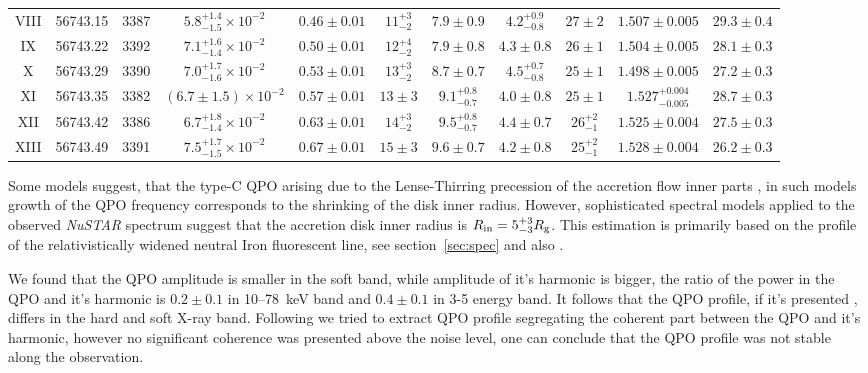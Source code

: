 \documentclass[a4paper,fleqn,usenatbib]{mnras}
\begin{document}
\begin{table}
\begin{tabular}{|c|c|c|c|c|c|c|c|c|c|c|}
VIII & 56743.15 & 3387 & $5.8_{-1.5}^{+1.4}\times10^{-2}$ & $0.46\pm0.01$ & $11_{-2}^{+3}$ & $7.9\pm0.9$ & $4.2_{-0.8}^{+0.9}$ & $27\pm2$ & $1.507\pm0.005$ & $29.3\pm0.4$ & \\
IX & 56743.22 & 3392 & $7.1_{-1.4}^{+1.6}\times10^{-2}$ & $0.50\pm0.01$ & $12_{-2}^{+4}$ & $7.9\pm0.8$ & $4.3\pm0.8$ & $26\pm1$ & $1.504\pm0.005$ & $28.1\pm0.3$ & \\
X & 56743.29 & 3390 & $7.0_{-1.6}^{+1.7}\times10^{-2}$ & $0.53\pm0.01$ & $13_{-2}^{+3}$ & $8.7\pm0.7$ & $4.5_{-0.8}^{+0.7}$ & $25\pm1$ & $1.498\pm0.005$ & $27.2\pm0.3$ & \\
XI & 56743.35 & 3382 & $(6.7\pm1.5)\times10^{-2}$ & $0.57\pm0.01$ & $13\pm3$ & $9.1_{-0.7}^{+0.8}$ & $4.0\pm0.8$ & $25\pm1$ & $1.527_{-0.005}^{+0.004}$ & $28.7\pm0.3$ & \\
XII & 56743.42 & 3386 & $6.7_{-1.4}^{+1.8}\times10^{-2}$ & $0.63\pm0.01$ & $14_{-2}^{+3}$ & $9.5_{-0.7}^{+0.8}$ & $4.4\pm0.7$ & $26_{-1}^{+2}$ & $1.525\pm0.004$ & $27.5\pm0.3$ & \\
XIII & 56743.49 & 3391 & $7.5_{-1.5}^{+1.7}\times10^{-2}$ & $0.67\pm0.01$ & $15\pm3$ & $9.6\pm0.7$ & $4.2\pm0.8$ & $25_{-1}^{+2}$ & $1.528\pm0.004$ & $26.2\pm0.3$ & \\
\hline
\end{tabular}
\end{table}

Some models suggest, that the type-C QPO arising due to the Lense-Thirring precession of the accretion flow inner parts \citep{1998ApJ...492L..59S, 2006ApJ...642..420S, 2009MNRAS.397L.101I}, in such models growth of the QPO frequency corresponds to the shrinking of the disk inner radius.
However, sophisticated spectral models applied to the observed {\it NuSTAR} spectrum suggest that the accretion disk inner radius is $R_{\rm in}= 5_{-3}^{+3}R_{\rm g}$.
This estimation is primarily based on the profile of the relativistically widened neutral Iron fluorescent line, see section~\ref{sec:spec} and also \citep{miller15_nust}.

We found that the QPO amplitude is smaller in the soft band, while amplitude of it's harmonic is bigger, the ratio of the power in the QPO and it's harmonic is $0.2\pm0.1$ in 10--78~keV band and $0.4\pm0.1$ in 3-5 energy band.
It follows that the QPO profile, if it's presented \citep[see, e.g.][]{2015MNRAS.446.3516I}, differs in the hard and soft X-ray band.
Following \citep{2015MNRAS.446.3516I} we tried to extract  QPO profile segregating the coherent part between the QPO and it's harmonic, however no significant coherence was presented above the noise level, one can conclude that the QPO profile was not stable along the observation. 
\end{document}
